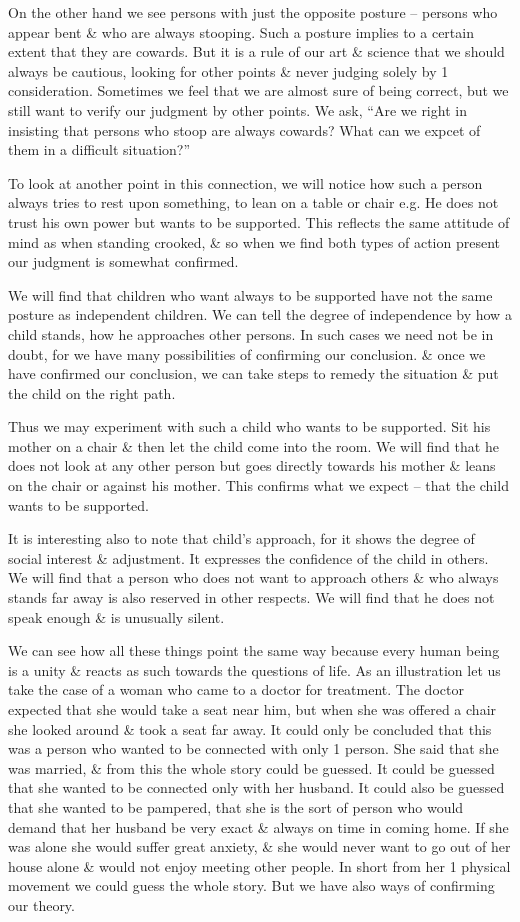 \documentclass{article}
\numberwithin{equation}{section}
\begin{document}
On the other hand we see persons with just the opposite posture -- persons who appear bent \& who are always stooping. Such a posture implies to a certain extent that they are cowards. But it is a rule of our art \& science that we should always be cautious, looking for other points \& never judging solely by 1 consideration. Sometimes we feel that we are almost sure of being correct, but we still want to verify our judgment by other points. We ask, ``Are we right in insisting that persons who stoop are always cowards? What can we expcet of them in a difficult situation?''

To look at another point in this connection, we will notice how such a person always tries to rest upon something, to lean on a table or chair e.g. He does not trust his own power but wants to be supported. This reflects the same attitude of mind as when standing crooked, \& so when we find both types of action present our judgment is somewhat confirmed.

We will find that children who want always to be supported have not the same posture as independent children. We can tell the degree of independence by how a child stands, how he approaches other persons. In such cases we need not be in doubt, for we have many possibilities of confirming our conclusion. \& once we have confirmed our conclusion, we can take steps to remedy the situation \& put the child on the right path.

Thus we may experiment with such a child who wants to be supported. Sit his mother on a chair \& then let the child come into the room. We will find that he does not look at any other person but goes directly towards his mother \& leans on the chair or against his mother. This confirms what we expect -- that the child wants to be supported.

It is interesting also to note that child's approach, for it shows the degree of social interest \& adjustment. It expresses the confidence of the child in others. We will find that a person who does not want to approach others \& who always stands far away is also reserved in other respects. We will find that he does not speak enough \& is unusually silent.

We can see how all these things point the same way because every human being is a unity \& reacts as such towards the questions of life. As an illustration let us take the case of a woman who came to a doctor for treatment. The doctor expected that she would take a seat near him, but when she was offered a chair she looked around \& took a seat far away. It could only be concluded that this was a person who wanted to be connected with only 1 person. She said that she was married, \& from this the whole story could be guessed. It could be guessed that she wanted to be connected only with her husband. It could also be guessed that she wanted to be pampered, that she is the sort of person who would demand that her husband be very exact \& always on time in coming home. If she was alone she would suffer great anxiety, \& she would never want to go out of her house alone \& would not enjoy meeting other people. In short from her 1 physical movement we could guess the whole story. But we have also ways of confirming our theory.
\end{document}
